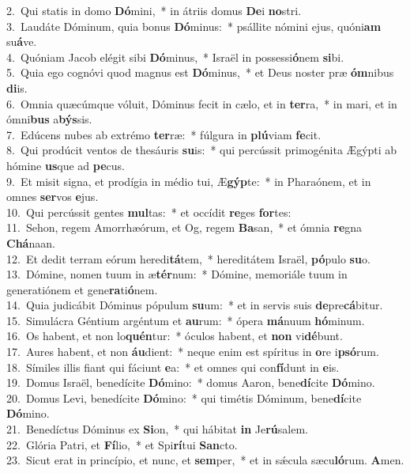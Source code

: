 {2.~}Qui statis in domo \textbf{Dó}mini,~* in átriis domus \textbf{De}i \textbf{no}stri.\\
{3.~}Laudáte Dóminum, quia bonus \textbf{Dó}minus:~* psállite nómini ejus, quóni\textbf{am} su\textbf{á}ve.\\
{4.~}Quóniam Jacob elégit sibi \textbf{Dó}minus,~* Israël in possessi\textbf{ó}nem \textbf{si}bi.\\
{5.~}Quia ego cognóvi quod magnus est \textbf{Dó}minus,~* et Deus noster præ \textbf{óm}nibus \textbf{di}is.\\
{6.~}Omnia quæcúmque vóluit, Dóminus fecit in cælo, et in \textbf{ter}ra,~* in mari, et in ómni\textbf{bus} a\textbf{býs}sis.\\
{7.~}Edúcens nubes ab extrémo \textbf{ter}ræ:~* fúlgura in \textbf{plú}viam \textbf{fe}cit.\\
{8.~}Qui prodúcit ventos de thesáuris \textbf{su}is:~* qui percússit primogénita Ægýpti ab hómine \textbf{us}que ad \textbf{pe}cus.\\
{9.~}Et misit signa, et prodígia in médio tui, Æ\textbf{gýp}te:~* in Pharaónem, et in omnes \textbf{ser}vos \textbf{e}jus.\\
{10.~}Qui percússit gentes \textbf{mul}tas:~* et occídit \textbf{re}ges \textbf{for}tes:\\
{11.~}Sehon, regem Amorrhæórum, et Og, regem \textbf{Ba}san,~* et ómnia \textbf{re}gna \textbf{Chá}naan.\\
{12.~}Et dedit terram eórum heredi\textbf{tá}tem,~* hereditátem Israël, \textbf{pó}pulo \textbf{su}o.\\
{13.~}Dómine, nomen tuum in æ\textbf{tér}num:~* Dómine, memoriále tuum in generatiónem et gene\textbf{ra}ti\textbf{ó}nem.\\
{14.~}Quia judicábit Dóminus pópulum \textbf{su}um:~* et in servis suis \textbf{de}pre\textbf{cá}bitur.\\
{15.~}Simulácra Géntium argéntum et \textbf{au}rum:~* ópera \textbf{má}nuum \textbf{hó}minum.\\
{16.~}Os habent, et non lo\textbf{quén}tur:~* óculos habent, et \textbf{non} vi\textbf{dé}bunt.\\
{17.~}Aures habent, et non \textbf{áu}dient:~* neque enim est spíritus in \textbf{o}re i\textbf{psó}rum.\\
{18.~}Símiles illis fiant qui fáciunt \textbf{e}a:~* et omnes qui con\textbf{fí}dunt in \textbf{e}is.\\
{19.~}Domus Israël, benedícite \textbf{Dó}mino:~* domus Aaron, bene\textbf{dí}cite \textbf{Dó}mino.\\
{20.~}Domus Levi, benedícite \textbf{Dó}mino:~* qui timétis Dóminum, bene\textbf{dí}cite \textbf{Dó}mino.\\
{21.~}Benedíctus Dóminus ex \textbf{Si}on,~* qui hábitat \textbf{in} Je\textbf{rú}salem.\\
{22.~}Glória Patri, et \textbf{Fí}lio,~* et Spi\textbf{rí}tui \textbf{San}cto.\\
{23.~}Sicut erat in princípio, et nunc, et \textbf{sem}per,~* et in sǽcula sæcu\textbf{ló}rum. \textbf{A}men.\\
